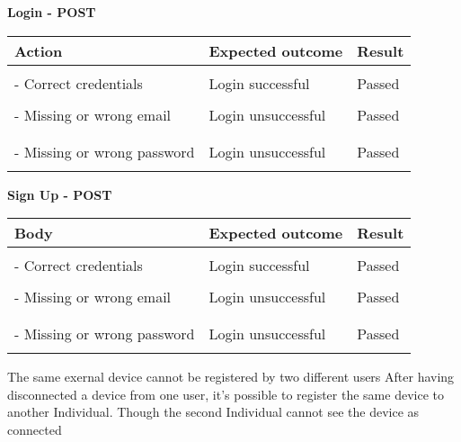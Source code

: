 \newpage

\textbf{Login - POST}
\begin{center}
	\begin{tabular}{|p{}|p{}|p{}|}
		\hline
		Action & Expected outcome & Result \\
		\hline
		&&\\
		- Correct credentials & Login successful & Passed\\
		\hline
		&&\\
		- Missing or wrong email & Login unsuccessful & Passed\\
		&&\\
		\hline
		&&\\
		- Missing or wrong password & Login unsuccessful & Passed\\
		&&\\
		\hline
	\end{tabular}
\end{center}

\newpage

\textbf{Sign Up - POST}
\begin{center}
	\begin{tabular}{|p{}|p{}|p{}|}
		\hline
		Body & Expected outcome & Result \\
		\hline
		&&\\
		- Correct credentials & Login successful & Passed\\
		\hline
		&&\\
		- Missing or wrong email & Login unsuccessful & Passed\\
		&&\\
		\hline
		&&\\
		- Missing or wrong password & Login unsuccessful & Passed\\
		&&\\
		\hline
	\end{tabular}
\end{center}

\newpage

The same exernal device cannot be registered by two different users
After having disconnected a device from one user, it's possible to register the same device to another Individual. Though the second Individual cannot see the device as connected

